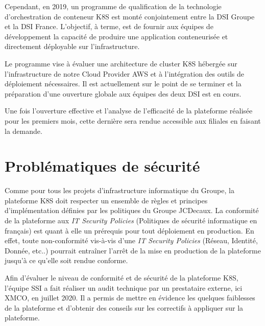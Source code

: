 Cependant, en 2019, un programme de qualification de la technologie d'orchestration de conteneur \ac{K8S} est monté 
conjointement entre la \ac{DSI} Groupe et la \ac{DSI} France. L'objectif, à terme, est de fournir aux équipes de 
développement la capacité de produire une application conteneurisée et directement déployable sur l'infrastructure.

Le programme vise à évaluer une architecture de cluster \ac{K8S} hébergée sur l'infrastructure de notre Cloud 
Provider \ac{AWS} et à l'intégration des outils de déploiement nécessaires. Il est actuellement sur le point de se 
terminer et la préparation d'une ouverture globale aux équipes des deux \ac{DSI} est en cours.

Une fois l'ouverture effective et l'analyse de l'efficacité de la plateforme réalisée pour les premiers mois, cette 
dernière sera rendue accessible aux filiales en faisant la demande.

\section{Problématiques de sécurité}
Comme pour tous les projets d'infrastructure informatique du Groupe, la plateforme \ac{K8S} doit respecter un ensemble de
règles et principes d'implémentation définies par les politiques du Groupe JCDecaux. La conformité de la plateforme aux
\emph{IT Security Policies} (\ie Politiques de sécurité informatique en français) est quant à elle un prérequis pour tout
déploiement en production. 
\newline En effet, toute non-conformité vis-à-vis d'une \emph{IT Security Policies} (\eg Réseau, Identité, Donnée, etc..)
pourrait entraîner l'arrêt de la mise en production de la plateforme jusqu'à ce qu'elle soit rendue conforme.

Afin d'évaluer le niveau de conformité et de sécurité de la plateforme \ac{K8S}, l'équipe \ac{SSI} a fait réaliser un 
audit technique par un prestataire externe, ici XMCO, en juillet 2020.
\newline Il a permis de mettre en évidence les quelques faiblesses de la plateforme et d'obtenir des conseils 
sur les correctifs à appliquer sur la plateforme.

